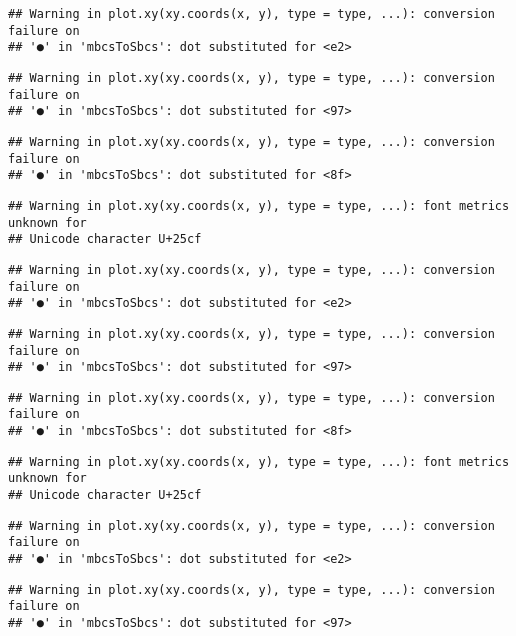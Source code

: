 \documentclass[
]{article}
\begin{document}
\begin{verbatim}
## Warning in plot.xy(xy.coords(x, y), type = type, ...): conversion failure on
## '●' in 'mbcsToSbcs': dot substituted for <e2>
\end{verbatim}

\begin{verbatim}
## Warning in plot.xy(xy.coords(x, y), type = type, ...): conversion failure on
## '●' in 'mbcsToSbcs': dot substituted for <97>
\end{verbatim}

\begin{verbatim}
## Warning in plot.xy(xy.coords(x, y), type = type, ...): conversion failure on
## '●' in 'mbcsToSbcs': dot substituted for <8f>
\end{verbatim}

\begin{verbatim}
## Warning in plot.xy(xy.coords(x, y), type = type, ...): font metrics unknown for
## Unicode character U+25cf
\end{verbatim}

\begin{verbatim}
## Warning in plot.xy(xy.coords(x, y), type = type, ...): conversion failure on
## '●' in 'mbcsToSbcs': dot substituted for <e2>
\end{verbatim}

\begin{verbatim}
## Warning in plot.xy(xy.coords(x, y), type = type, ...): conversion failure on
## '●' in 'mbcsToSbcs': dot substituted for <97>
\end{verbatim}

\begin{verbatim}
## Warning in plot.xy(xy.coords(x, y), type = type, ...): conversion failure on
## '●' in 'mbcsToSbcs': dot substituted for <8f>
\end{verbatim}

\begin{verbatim}
## Warning in plot.xy(xy.coords(x, y), type = type, ...): font metrics unknown for
## Unicode character U+25cf
\end{verbatim}

\begin{verbatim}
## Warning in plot.xy(xy.coords(x, y), type = type, ...): conversion failure on
## '●' in 'mbcsToSbcs': dot substituted for <e2>
\end{verbatim}

\begin{verbatim}
## Warning in plot.xy(xy.coords(x, y), type = type, ...): conversion failure on
## '●' in 'mbcsToSbcs': dot substituted for <97>
\end{verbatim}
\end{document}
